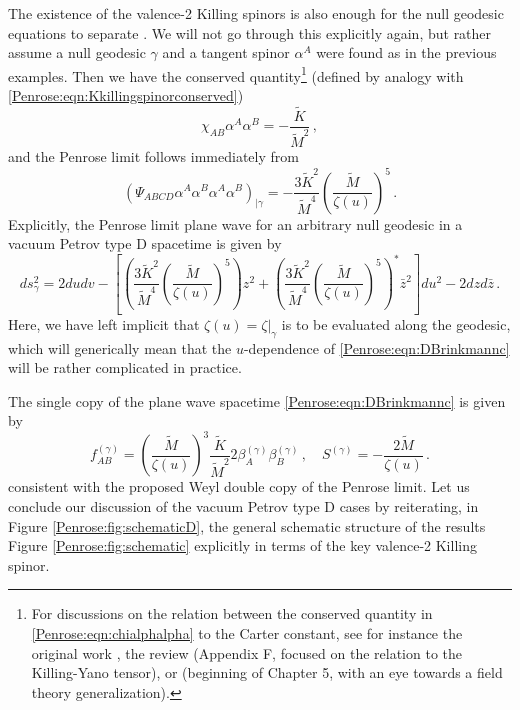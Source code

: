 The existence of the valence-2 Killing spinors is also enough for the null geodesic equations to separate \cite{Walker:1970un}. We will not go through this explicitly again, but rather assume a null geodesic $\gamma$ and a tangent spinor $\alpha^A$ were found as in the previous examples. Then we have the conserved quantity\footnote{For discussions on the relation between the conserved quantity in \eqref{Penrose:eqn:chialphalpha} to the Carter constant, see for instance the original work \cite{Walker:1970un}, the review \cite{Frolov:2017kze} (Appendix F, focused on the relation to the Killing-Yano tensor), or \cite{Aksteiner:2014zyp} (beginning of Chapter 5, with an eye towards a field theory generalization).} (defined by analogy with \eqref{Penrose:eqn:Kkillingspinorconserved})
\begin{equation}\label{Penrose:eqn:chialphalpha}
\chi_{AB} \alpha^{A}\alpha^{B} = - \frac{\tilde{K}}{\tilde{M}^2} \, ,
\end{equation}
and the Penrose limit follows immediately from
\begin{equation}
\left(\Psi_{ABCD}  \alpha^{A}\alpha^{B} \alpha^{A}\alpha^{B}\right)_{|\gamma}  = -\frac{3\tilde{K}^2}{\tilde{M}^4} \left(\frac{\tilde{M}}{\zeta(u)}\right)^5 \, .
\end{equation}
Explicitly, the Penrose limit plane wave for an arbitrary null geodesic in a vacuum Petrov type D spacetime is given by
\begin{equation}\label{Penrose:eqn:DBrinkmannc}
ds_{\gamma}^2 = 2 du dv - \left\lbrack \left(\frac{3\tilde{K}^2}{\tilde{M}^4} \left(\frac{\tilde{M}}{\zeta(u)}\right)^5\right) z^2 + \left(\frac{3\tilde{K}^2}{\tilde{M}^4} \left(\frac{\tilde{M}}{\zeta(u)}\right)^5\right)^* \bar{z}^2\right\rbrack du^2 - 2 dz d\bar{z}  \, .
\end{equation}
Here, we have left implicit that $\zeta(u) = \zeta|_{\gamma}$ is to be evaluated along the geodesic, which will generically mean that the $u$-dependence of \eqref{Penrose:eqn:DBrinkmannc} will be rather complicated in practice.

The single copy of the plane wave spacetime \eqref{Penrose:eqn:DBrinkmannc} is given by
\begin{equation}
f_{AB}^{(\gamma)} = \left(\frac{\tilde{M}}{\zeta(u)}\right)^3 \frac{\tilde{K}}{\tilde{M}^2} 2 \beta^{(\gamma)}_{A}\beta_B^{(\gamma)} \, , \quad S^{(\gamma)} = - \frac{2 \tilde{M}}{\zeta(u)} \, .
\end{equation}
consistent with the proposed Weyl double copy of the Penrose limit. Let us conclude our discussion of the vacuum Petrov type D cases by reiterating, in Figure \ref{Penrose:fig:schematicD}, the general schematic structure of the results Figure \ref{Penrose:fig:schematic} explicitly in terms of the key valence-2 Killing spinor. 

